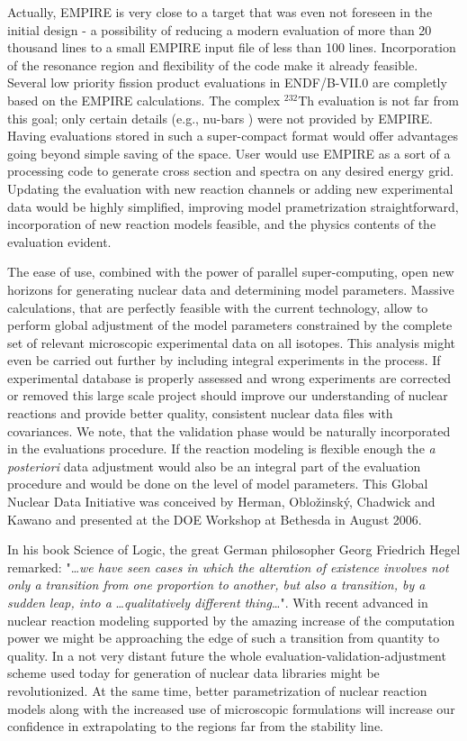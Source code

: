 \documentclass[twocolumn,amsmath,amssymb,10pt,groupedaddress,letter]{revtex4}
\begin{document}
Actually, EMPIRE is very close to a target that was even not foreseen in the initial design - a possibility of reducing a modern evaluation of more than 20 thousand lines to a small EMPIRE input file of less than 100 lines. Incorporation of the resonance region and flexibility of the code make it already feasible. Several low priority fission product evaluations in ENDF/B-VII.0 are completly based on the EMPIRE calculations. The complex $^{232}$Th evaluation is not far from this goal; only certain details (e.g., nu-bars ) were not provided by EMPIRE. Having evaluations stored in such a super-compact format would offer advantages going beyond simple saving of the space. User would use EMPIRE as a sort of a processing code to generate cross section and spectra on any desired energy grid.  Updating the evaluation with new reaction channels or adding new experimental data would be highly simplified, improving model prametrization straightforward, incorporation of new reaction models feasible, and the physics contents of the evaluation evident.

The ease of use, combined with the power of parallel super-computing, open new horizons for generating nuclear data and determining model parameters. Massive calculations, that are perfectly feasible with the current technology, allow to perform global adjustment of the model parameters constrained by the complete set of  relevant microscopic experimental data on all isotopes. This analysis might even be carried out further by including integral experiments in the process. If experimental database is properly assessed and wrong experiments are corrected or removed this large scale project should improve our understanding of nuclear reactions and  provide better quality, consistent nuclear data files with covariances. We note, that the validation phase would be naturally incorporated in the evaluations procedure. If the reaction modeling is flexible enough the \textit{a posteriori} data adjustment would also be an integral part of the evaluation procedure and would be done on the level of model parameters. This Global Nuclear Data Initiative was conceived by Herman, Oblo\v zinsk\' y, Chadwick and Kawano and presented at the DOE Workshop at Bethesda in August 2006.

In his book Science of Logic, the great German philosopher Georg Friedrich Hegel remarked:
"\ldots \textit{we have seen cases in which the alteration of existence involves not only a transition from one proportion to another, but also a transition, by a sudden leap, into a} \ldots \textit{qualitatively
different thing}\ldots". With recent advanced in nuclear reaction modeling supported by the amazing increase of the computation power we might be approaching the edge of such a transition from quantity to quality. In a not very distant future the whole evaluation-validation-adjustment scheme used  today for generation of nuclear data libraries might be revolutionized. At the same time, better parametrization of nuclear reaction models along with the increased use of microscopic formulations will increase our confidence in extrapolating to the regions far from the stability line.
\end{document}
